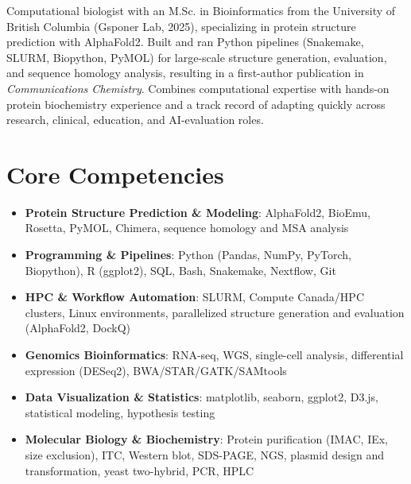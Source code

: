\documentclass[11pt,a4paper,sans]{moderncv}
\begin{document}
\makecvtitle


\vspace{6pt}
\small{Computational biologist with an M.Sc. in Bioinformatics from the University of British Columbia (Gsponer Lab, 2025), specializing in protein structure prediction with AlphaFold2. Built and ran Python pipelines (Snakemake, SLURM, Biopython, PyMOL) for large-scale structure generation, evaluation, and sequence homology analysis, resulting in a first-author publication in \textit{Communications Chemistry}. Combines computational expertise with hands-on protein biochemistry experience and a track record of adapting quickly across research, clinical, education, and AI-evaluation roles.}


\section{Core Competencies}
\vspace{1pt}
\begin{itemize}

\item \textbf{Protein Structure Prediction \& Modeling}: AlphaFold2, BioEmu, Rosetta, PyMOL, Chimera, sequence homology and MSA analysis

\item \textbf{Programming \& Pipelines}: Python (Pandas, NumPy, PyTorch, Biopython), R (ggplot2), SQL, Bash, Snakemake, Nextflow, Git

\item \textbf{HPC \& Workflow Automation}: SLURM, Compute Canada/HPC clusters, Linux environments, parallelized structure generation and evaluation (AlphaFold2, DockQ)

\item \textbf{Genomics Bioinformatics}: RNA-seq, WGS, single-cell analysis, differential expression (DESeq2), BWA/STAR/GATK/SAMtools

\item \textbf{Data Visualization \& Statistics}: matplotlib, seaborn, ggplot2, D3.js, statistical modeling, hypothesis testing

\item \textbf{Molecular Biology \& Biochemistry}: Protein purification (IMAC, IEx, size exclusion), ITC, Western blot, SDS-PAGE, NGS, plasmid design and transformation, yeast two-hybrid, PCR, HPLC

\end{itemize}
\end{document}
